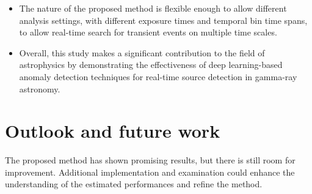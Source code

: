 \begin{itemize}
    \item The nature of the proposed method is flexible enough to allow different analysis settings, with different exposure times and temporal bin time spans, to allow real-time search for transient events on multiple time scales.  
    
    \item Overall, this study makes a significant contribution to the field of astrophysics by demonstrating the effectiveness of deep learning-based anomaly detection techniques for real-time source detection in gamma-ray astronomy. 
    
\end{itemize}


\section{Outlook and future work}

The proposed method has shown promising results, but there is still room for improvement. Additional implementation and examination could enhance the understanding of the estimated  performances and refine the method. 

